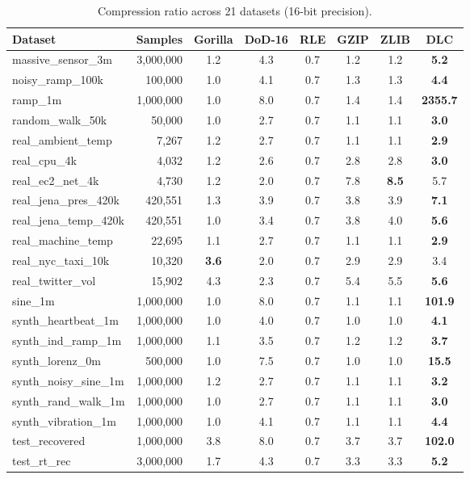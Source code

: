 \documentclass[runningheads]{llncs}
\begin{document}
\begin{table}[t]
\centering
\caption{Compression ratio across 21 datasets (16-bit precision).}
\label{tab:ratios}
\scriptsize
\begin{tabular}{lrcccccc}
\toprule
\textbf{Dataset} & \textbf{Samples} & \textbf{Gorilla} & \textbf{DoD-16} & \textbf{RLE} & \textbf{GZIP} & \textbf{ZLIB} & \textbf{DLC} \\
\midrule
massive\_sensor\_3m & 3,000,000 & 1.2 & 4.3 & 0.7 & 1.2 & 1.2 & \textbf{5.2} \\
noisy\_ramp\_100k & 100,000 & 1.0 & 4.1 & 0.7 & 1.3 & 1.3 & \textbf{4.4} \\
ramp\_1m & 1,000,000 & 1.0 & 8.0 & 0.7 & 1.4 & 1.4 & \textbf{2355.7} \\
random\_walk\_50k & 50,000 & 1.0 & 2.7 & 0.7 & 1.1 & 1.1 & \textbf{3.0} \\
real\_ambient\_temp & 7,267 & 1.2 & 2.7 & 0.7 & 1.1 & 1.1 & \textbf{2.9} \\
real\_cpu\_4k & 4,032 & 1.2 & 2.6 & 0.7 & 2.8 & 2.8 & \textbf{3.0} \\
real\_ec2\_net\_4k & 4,730 & 1.2 & 2.0 & 0.7 & 7.8 & \textbf{8.5} & 5.7 \\
real\_jena\_pres\_420k & 420,551 & 1.3 & 3.9 & 0.7 & 3.8 & 3.9 & \textbf{7.1} \\
real\_jena\_temp\_420k & 420,551 & 1.0 & 3.4 & 0.7 & 3.8 & 4.0 & \textbf{5.6} \\
real\_machine\_temp & 22,695 & 1.1 & 2.7 & 0.7 & 1.1 & 1.1 & \textbf{2.9} \\
real\_nyc\_taxi\_10k & 10,320 & \textbf{3.6} & 2.0 & 0.7 & 2.9 & 2.9 & 3.4 \\
real\_twitter\_vol & 15,902 & 4.3 & 2.3 & 0.7 & 5.4 & 5.5 & \textbf{5.6} \\
sine\_1m & 1,000,000 & 1.0 & 8.0 & 0.7 & 1.1 & 1.1 & \textbf{101.9} \\
synth\_heartbeat\_1m & 1,000,000 & 1.0 & 4.0 & 0.7 & 1.0 & 1.0 & \textbf{4.1} \\
synth\_ind\_ramp\_1m & 1,000,000 & 1.1 & 3.5 & 0.7 & 1.2 & 1.2 & \textbf{3.7} \\
synth\_lorenz\_0m & 500,000 & 1.0 & 7.5 & 0.7 & 1.0 & 1.0 & \textbf{15.5} \\
synth\_noisy\_sine\_1m & 1,000,000 & 1.2 & 2.7 & 0.7 & 1.1 & 1.1 & \textbf{3.2} \\
synth\_rand\_walk\_1m & 1,000,000 & 1.0 & 2.7 & 0.7 & 1.1 & 1.1 & \textbf{3.0} \\
synth\_vibration\_1m & 1,000,000 & 1.0 & 4.1 & 0.7 & 1.1 & 1.1 & \textbf{4.4} \\
test\_recovered & 1,000,000 & 3.8 & 8.0 & 0.7 & 3.7 & 3.7 & \textbf{102.0} \\
test\_rt\_rec & 3,000,000 & 1.7 & 4.3 & 0.7 & 3.3 & 3.3 & \textbf{5.2} \\
\bottomrule
\end{tabular}
\end{table}
\end{document}
